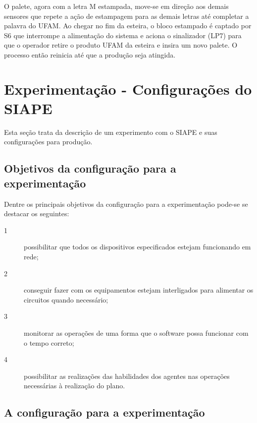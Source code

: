 O palete, agora com a letra M estampada, move-se em direção aos demais sensores que repete a ação de estampagem para as demais letras até completar a palavra do UFAM. Ao chegar no fim da esteira, o bloco estampado é captado por S6 que interrompe a alimentação do sistema e aciona o sinalizador (LP7) para que o operador retire o produto UFAM da esteira e insira um novo palete. O processo então reinicia até que a produção seja atingida. 	  
	 




\section{Experimentação - Configurações do SIAPE}


Esta seção trata da descrição de um experimento com o SIAPE e suas configurações para produção.

\subsection{Objetivos da configuração para a experimentação}

Dentre os principais objetivos da configuração para a experimentação pode-se se destacar os seguintes:

\begin{description}
\item [1]possibilitar que todos os dispositivos especificados estejam  funcionando em  rede;
\item [2]conseguir fazer com os equipamentos estejam interligados para alimentar os circuitos quando necessário;
\item [3]monitorar as operações de uma forma que o software possa funcionar com o tempo correto;
\item [4]possibilitar as realizações das habilidades dos agentes  nas operações necessárias à realização do plano.
\end{description}

\subsection{A configuração para a experimentação}


